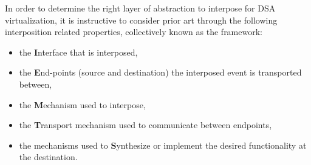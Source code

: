In order to determine the right layer of abstraction to interpose for DSA
virtualization, it is instructive to consider prior art through the following
interposition related properties, collectively known as the \textbf{\iemts} framework:

\begin{itemize}[nosep, topsep=0em, leftmargin=1em,labelwidth=*,align=left]
\item the \textbf{I}nterface that is interposed,
\item the \textbf{E}nd-points (source and destination) the interposed event is
transported between,
\item the \textbf{M}echanism used to interpose,
\item the \textbf{T}ransport mechanism used to communicate between endpoints,
\item the mechanisms used to \textbf{S}ynthesize or implement the desired
functionality at the destination.
\end{itemize}

\begin{table}[tt!]
\centering
\footnotesize
{}
\caption{Comparing virtualization designs using the \texttt{IEMTS} framework.}
\label{tab:new-dims}
\end{table}

